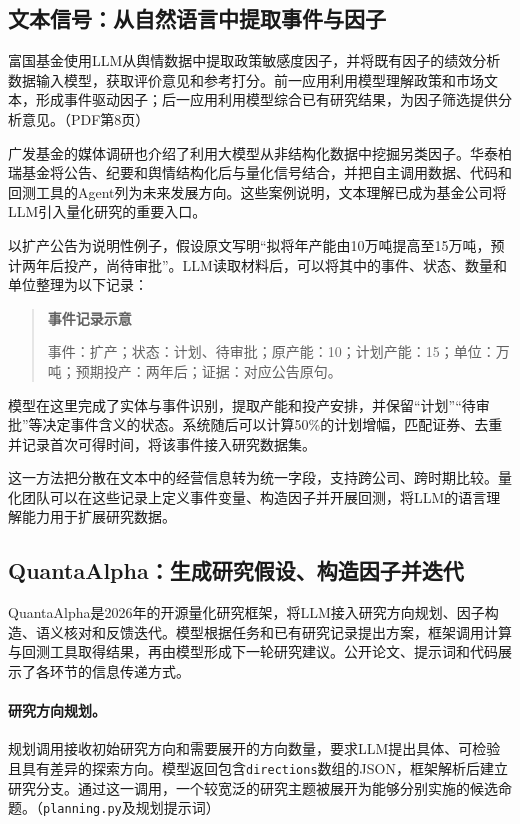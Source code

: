 \documentclass[11pt,a4paper,fontset=none]{ctexart}
\begin{document}
\subsection{文本信号：从自然语言中提取事件与因子}
富国基金使用LLM从舆情数据中提取政策敏感度因子，并将既有因子的绩效分析数据输入模型，获取评价意见和参考打分。前一应用利用模型理解政策和市场文本，形成事件驱动因子；后一应用利用模型综合已有研究结果，为因子筛选提供分析意见。（PDF第8页）

广发基金的媒体调研也介绍了利用大模型从非结构化数据中挖掘另类因子。华泰柏瑞基金将公告、纪要和舆情结构化后与量化信号结合，并把自主调用数据、代码和回测工具的Agent列为未来发展方向。这些案例说明，文本理解已成为基金公司将LLM引入量化研究的重要入口。

以扩产公告为说明性例子，假设原文写明“拟将年产能由10万吨提高至15万吨，预计两年后投产，尚待审批”。LLM读取材料后，可以将其中的事件、状态、数量和单位整理为以下记录：

\begin{quote}\small
\textbf{事件记录示意}\par
事件：扩产；状态：计划、待审批；原产能：10；计划产能：15；单位：万吨；预期投产：两年后；证据：对应公告原句。
\end{quote}

模型在这里完成了实体与事件识别，提取产能和投产安排，并保留“计划”“待审批”等决定事件含义的状态。系统随后可以计算50\%的计划增幅，匹配证券、去重并记录首次可得时间，将该事件接入研究数据集。

这一方法把分散在文本中的经营信息转为统一字段，支持跨公司、跨时期比较。量化团队可以在这些记录上定义事件变量、构造因子并开展回测，将LLM的语言理解能力用于扩展研究数据。

\subsection{QuantaAlpha：生成研究假设、构造因子并迭代}
QuantaAlpha是2026年的开源量化研究框架，将LLM接入研究方向规划、因子构造、语义核对和反馈迭代。模型根据任务和已有研究记录提出方案，框架调用计算与回测工具取得结果，再由模型形成下一轮研究建议。公开论文、提示词和代码展示了各环节的信息传递方式。

\paragraph{研究方向规划。}
规划调用接收初始研究方向和需要展开的方向数量，要求LLM提出具体、可检验且具有差异的探索方向。模型返回包含\texttt{directions}数组的JSON，框架解析后建立研究分支。通过这一调用，一个较宽泛的研究主题被展开为能够分别实施的候选命题。（\texttt{planning.py}及规划提示词）
\end{document}
